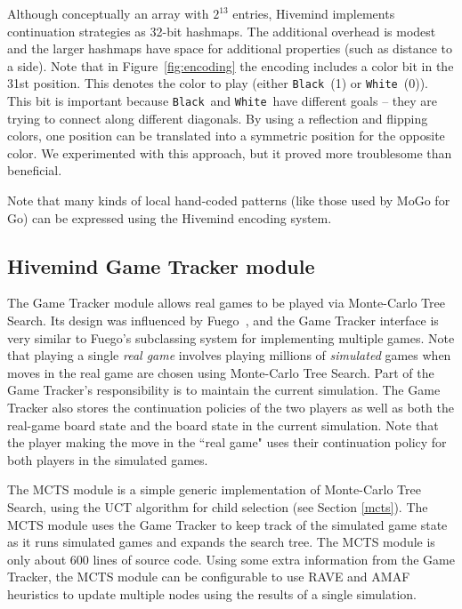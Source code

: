 \documentclass{acm_proc_article-sp}
\newcommand{\hblack}{\texttt{Black}}
\newcommand{\hwhite}{\texttt{White}}
\begin{document}
Although conceptually an array with $2^{13}$ entries, Hivemind implements continuation strategies as
32-bit hashmaps.  
The additional overhead is modest and the larger hashmaps  have space for additional properties (such as distance to a side).
Note that in Figure~\ref{fig:encoding} the encoding includes a color bit in the 31st position. This denotes the color to play (either \hblack\ (1) or \hwhite\ (0)). 
This bit is important because \hblack\ and \hwhite\ have different goals -- they are trying to connect along different diagonals. 
By using a reflection and flipping colors, one position can be translated into a symmetric  position for the opposite color. 
We experimented with this approach, but it proved more troublesome than beneficial.

Note that many kinds of local hand-coded patterns (like those used by MoGo \cite{gelly2006modification} for Go) can be expressed using the Hivemind encoding system.

\subsection{Hivemind Game Tracker module}
\label{s:tracker}

The Game Tracker module allows real games to be played via Monte-Carlo Tree Search.
Its design was influenced by Fuego~\cite{Fuego},  and the Game Tracker interface is very similar to Fuego's subclassing system for implementing multiple games.
Note that playing a single \emph{real game} involves playing millions of  \emph{simulated} games when
moves in the real game are chosen using Monte-Carlo Tree Search.
Part of the Game Tracker's responsibility is to maintain the 
current simulation.
The Game Tracker also stores the continuation policies of the two players as well as both
the real-game board state and the board state in the current simulation.
Note that the player making the move in the ``real game" uses their continuation policy for both players in the simulated games.


The MCTS  module is a simple 
generic implementation of Monte-Carlo Tree Search, using the UCT algorithm for child selection
(see Section \ref{mcts}).
The MCTS module uses the Game Tracker to keep track of the simulated game state 
as it runs simulated games and expands the search tree.
The MCTS module is only about 600 lines of source code. 
Using some extra information from the Game Tracker,  
the MCTS module can be configurable to use RAVE and AMAF heuristics to 
update multiple nodes using the results of a single simulation.  
\end{document}
